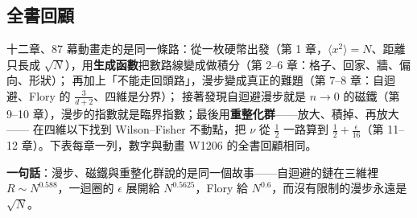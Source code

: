 \clearpage
\subsection{全書回顧}

十二章、87 幕動畫走的是同一條路：從一枚硬幣出發（第 1 章，$\langle x^2\rangle=N$、距離只長成 $\sqrt N$），用\textbf{生成函數}把數路線變成做積分（第 2--6 章：格子、回家、牆、偏向、形狀）；
再加上「不能走回頭路」，漫步變成真正的難題（第 7--8 章：自迴避、Flory 的 $\frac3{d+2}$、四維是分界）；
接著發現自迴避漫步就是 $n\to0$ 的磁鐵（第 9--10 章），漫步的指數就是臨界指數；最後用\textbf{重整化群}——放大、積掉、再放大——
在四維以下找到 Wilson--Fisher 不動點，把 $\nu$ 從 $\frac12$ 一路算到 $\frac12+\frac\epsilon{16}$（第 11--12 章）。下表每章一列，數字與動畫 W1206 的全書回顧相同。
\begin{center}
\small\setlength{\tabcolsep}{4pt}\renewcommand{\arraystretch}{1.3}
\TwelveTabBook
\end{center}
\textbf{一句話}：漫步、磁鐵與重整化群說的是同一個故事——自迴避的鏈在三維裡 $R\sim N^{0.588}$，一迴圈的 $\epsilon$ 展開給 $N^{0.5625}$，Flory 給 $N^{0.6}$，而沒有限制的漫步永遠是 $\sqrt N$。
